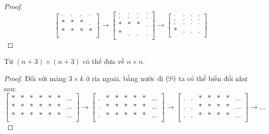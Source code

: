 \documentclass[11pt]{scrartcl}
\begin{document}
\begin{itemize}[label=, leftmargin=0em, itemsep=0.5em]
\begin{sol}
\begin{proof}
\[\begin{bmatrix}
            . & . & .&.\\
            * & * & *&.\\
            * & * & *&*\\
        \end{bmatrix}
        \to 
        \begin{bmatrix}
            . & . & .&.\\
            . & . & .&.\\
            * & * & *&.\\
            * & . & .&.\\
        \end{bmatrix}
        \to 
        \begin{bmatrix}
            . & . & .&.\\
            . & . & .&.\\
            . & . & .&.\\
            * & . & .&.\\
        \end{bmatrix}
        \]
        \end{proof}
         Từ $(n + 3)\times (n + 3)$ có thể đưa về $n \times n$.
        \begin{proof}
            Đối với mảng $3 \times k$ ở rìa ngoài, bằng nước đi $(\fa)$ ta có thể biến đổi như sau: 
            \[
                \begin{bmatrix}
                    * & * & *&*&*&*&...\\
                    * & * & *&*&*&*&...\\
                    * & * & *&*&*&*&...\\
                \end{bmatrix}
            \to 
                \begin{bmatrix}
                    . & * & *&*&*&*&...\\
                    . & * & *&*&*&*&...\\
                    . & * & *&*&*&*&...\\
                \end{bmatrix}
            \to 
                \begin{bmatrix}
                    . & . & *&*&*&*&...\\
                    . & . & *&*&*&*&...\\
                    . & . & *&*&*&*&...\\
                \end{bmatrix}
                \to \dots
\]
\end{proof}
\end{sol}
\end{itemize}
\end{document}
